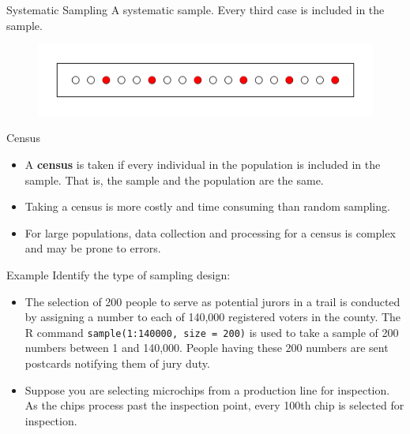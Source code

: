 \documentclass{beamer}
\begin{document}
\begin{frame}{Systematic Sampling}
A systematic sample.  Every third case is included in the sample.  
\begin{figure}
\includegraphics[scale=0.6]{figure/sys.pdf}
\end{figure}
\end{frame}

\begin{frame}{Census}
\begin{itemize}
\item A \textbf{census} is taken if every individual in the population is included in the sample.  That is, the sample and the population are the same.
\vspace{5pt}
\item Taking a census is more costly and time consuming than random sampling.
\vspace{5pt}
\item For large populations, data collection and processing for a census is complex and may be prone to errors.
\end{itemize}
\end{frame}

\begin{frame}{Example}
Identify the type of sampling design:\\
\vspace{10pt}
\begin{itemize}
\item The selection of 200 people to serve as potential jurors in a trail is conducted by assigning a number to each of 140,000 registered voters in the county.  The R command \texttt{sample(1:140000, size = 200)} is used to take a sample of 200 numbers between 1 and 140,000.  People having these 200 numbers are sent postcards notifying them of jury duty.\\
\vspace{10pt}
\item Suppose you are selecting microchips from a production line for inspection.  As the chips process past the inspection point, every 100th chip is selected for inspection.\\
\end{itemize} 
\end{frame}
\end{document}
